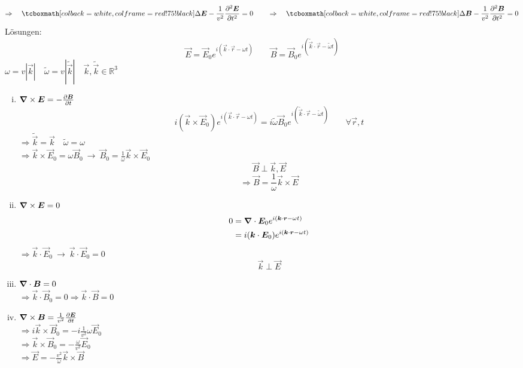 \begin{equation*}
\Rightarrow \quad \rmbox{\Delta \vec{E} - \frac{1}{v^2} \prt{^2 \vec{E}}{t^2} = 0} \qquad 
\Rightarrow \quad \rmbox{\Delta \vec{B} - \frac{1}{v^2} \prt{^2 \vec{B}}{t^2} = 0}
\end{equation*}
Lösungen:
\begin{equation*}
\vec{E} = \vec{E}_0 e^{i(\vec{k} \cdot \vec{r} - \omega t)} \qquad \vec{B} = \vec{B}_0 e^{i(\tilde{\vec{k}} \cdot \vec{r} - \tilde{\omega} t)}
\end{equation*}
$ \omega = v |\vec{k}| \quad \tilde{\omega} = v |\tilde{\vec{k}}| \quad \vec{k}, \tilde{\vec{k}} \in \mathbb{R}^3 $
\begin{enumerate}[i)]
	\item $ \bm{\nabla} \times \bm{E} = - \frac{\partial \bm{B}}{\partial t} $
	\begin{equation*}
	i (\vec{k} \times \vec{E}_0) e^{i(\vec{k} \cdot \vec{r} - \omega t)} = i \tilde{\omega} \vec{B}_0 e^{i(\tilde{\vec{k}} \cdot \vec{r} - \tilde\omega t)} \qquad \forall \vec{r},t
	\end{equation*}
	$ \Rightarrow \tilde{\vec{k}} = \vec{k} \quad \tilde{\omega} = \omega $\\
	$ \Rightarrow \vec{k} \times \vec{E}_0 = \omega \vec{B}_0 \ \rightarrow \ \vec{B}_0 = \frac{1}{\omega} \vec{k} \times \vec{E}_0 $
	$$\vec{B} \perp \vec{k}, \vec{E}$$
	$$ \Rightarrow \vec{B} = \frac{1}{\omega} \vec{k} \times \vec{E} $$
	\item $ \bm{\nabla} \times \bm{E} = 0 $
	\begin{align*}
	0 &= \bm{\nabla} \cdot \bm{E}_0 e^{i(\bm{k} \cdot \bm{r} - \omega t)}\\
	&= i(\bm{k} \cdot \bm{E}_0) e^{i(\bm{k} \cdot \bm{r} - \omega t)}
	\end{align*}
	$ \Rightarrow \vec{k} \cdot \vec{E}_0 \ \rightarrow \ \vec{k} \cdot \vec{E}_0 = 0 $
	$$ \vec{k} \perp \vec{E} $$
	\item $ \bm{\nabla} \cdot \bm{B} = 0 $\\
	$ \Rightarrow \vec{k} \cdot \vec{B}_0 = 0 \Rightarrow \vec{k} \cdot \vec{B} = 0 $
	\item $ \bm{\nabla} \times \bm{B} = \frac{1}{v^2} \frac{\partial \bm{E}}{\partial t} $\\
	$ \Rightarrow i \vec{k} \times \vec{B}_0 = - i \frac{1}{v^2} \omega \vec{E}_0 $\\
	$ \Rightarrow \vec{k} \times \vec{B}_0 = - \frac{\omega}{v^2} \vec{E}_0 $\\
	$ \Rightarrow \vec{E} = -\frac{v^2}{\omega} \vec{k} \times \vec{B} $
\end{enumerate}
